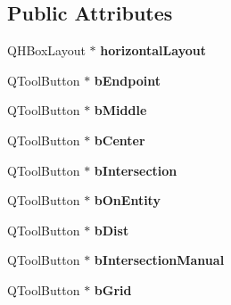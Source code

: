 \subsection*{Public Attributes}
\begin{DoxyCompactItemize}
\item 
\hypertarget{classUi__QG__SnapToolBar_abb773d25891bdc959572258e55aa64fb}{Q\-H\-Box\-Layout $\ast$ {\bfseries horizontal\-Layout}}\label{classUi__QG__SnapToolBar_abb773d25891bdc959572258e55aa64fb}

\item 
\hypertarget{classUi__QG__SnapToolBar_af7c987ed5e5100bb6d44781dc55c4673}{Q\-Tool\-Button $\ast$ {\bfseries b\-Endpoint}}\label{classUi__QG__SnapToolBar_af7c987ed5e5100bb6d44781dc55c4673}

\item 
\hypertarget{classUi__QG__SnapToolBar_a56906d2e66c96b27583a17328346ba33}{Q\-Tool\-Button $\ast$ {\bfseries b\-Middle}}\label{classUi__QG__SnapToolBar_a56906d2e66c96b27583a17328346ba33}

\item 
\hypertarget{classUi__QG__SnapToolBar_a3ad75354a1b4ec5efab39c3e5e666e52}{Q\-Tool\-Button $\ast$ {\bfseries b\-Center}}\label{classUi__QG__SnapToolBar_a3ad75354a1b4ec5efab39c3e5e666e52}

\item 
\hypertarget{classUi__QG__SnapToolBar_a52953d2f877aef2d33531696b104225b}{Q\-Tool\-Button $\ast$ {\bfseries b\-Intersection}}\label{classUi__QG__SnapToolBar_a52953d2f877aef2d33531696b104225b}

\item 
\hypertarget{classUi__QG__SnapToolBar_a6c965bce590c3cec59bf4f548426a916}{Q\-Tool\-Button $\ast$ {\bfseries b\-On\-Entity}}\label{classUi__QG__SnapToolBar_a6c965bce590c3cec59bf4f548426a916}

\item 
\hypertarget{classUi__QG__SnapToolBar_aa0300949d43bf4136effb1e54152d3bc}{Q\-Tool\-Button $\ast$ {\bfseries b\-Dist}}\label{classUi__QG__SnapToolBar_aa0300949d43bf4136effb1e54152d3bc}

\item 
\hypertarget{classUi__QG__SnapToolBar_a864f7f10ac170f67f5f2a22781a46db8}{Q\-Tool\-Button $\ast$ {\bfseries b\-Intersection\-Manual}}\label{classUi__QG__SnapToolBar_a864f7f10ac170f67f5f2a22781a46db8}

\item 
\hypertarget{classUi__QG__SnapToolBar_a0a16b68030694374dbda28494178a5b2}{Q\-Tool\-Button $\ast$ {\bfseries b\-Grid}}\label{classUi__QG__SnapToolBar_a0a16b68030694374dbda28494178a5b2}


\end{DoxyCompactItemize}
